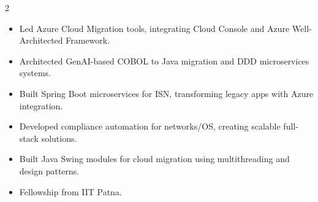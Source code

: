 \documentclass[10pt,a4paper,ragged2e,withhyper]{altacv}
\begin{document}
\makecvheader

\begin{paracol}{2}

\begin{itemize}\vspace{-0.3em}
\item Led Azure Cloud Migration tools, integrating Cloud Console and Azure Well-Architected Framework.
\item Architected GenAI-based COBOL to Java migration and DDD microservices systems.
\end{itemize}\vspace{-0.2em}

\begin{itemize}\vspace{-0.3em}
\item Built Spring Boot microservices for ISN, transforming legacy apps with Azure integration.
\end{itemize}\vspace{-0.2em}

\begin{itemize}\vspace{-0.3em}
\item Developed compliance automation for networks/OS, creating scalable full-stack solutions.
\end{itemize}\vspace{-0.2em}

\begin{itemize}\vspace{-0.3em}
\item Built Java Swing modules for cloud migration using multithreading and design patterns.
\end{itemize}

\begin{itemize}\vspace{-0.3em}
\item Fellowship from IIT Patna.
\end{itemize}\vspace{-0.2em}


\end{paracol}
\end{document}
